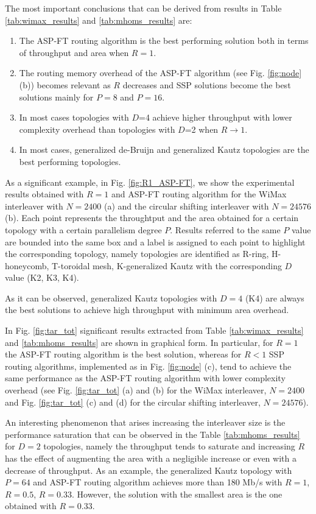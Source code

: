 \documentclass[10pt,twocolumn,journal]{IEEEtran}
\begin{document}
The most important conclusions that can be derived from results in Table \ref{tab:wimax_results} and 
\ref{tab:mhoms_results} are:
\begin{enumerate}
\item The ASP-FT routing algorithm is the best performing solution both in terms of throughput and area 
when $R=1$.
\item The routing memory overhead of the ASP-FT algorithm (see Fig. \ref{fig:node} (b)) becomes 
relevant as $R$ decreases and SSP solutions become the best solutions mainly for $P=8$ and $P=16$.
\item In most cases topologies with $D$=4 achieve higher throughput with lower complexity overhead than topologies 
with $D$=2 when $R \to 1$.
\item In most cases, generalized de-Bruijn and generalized Kautz topologies are the best performing topologies.
\end{enumerate}
As a significant example, in Fig. \ref{fig:R1_ASP-FT}, 
we show the experimental results obtained with $R=1$ and ASP-FT routing algorithm 
for the WiMax interleaver with $N=2400$ (a) and the circular shifting interleaver with $N=24576$ (b).
Each point represents the throughtput and the area 
obtained for a certain topology with a certain parallelism degree $P$. Results referred to the same $P$ value are bounded 
into the same box and a label is assigned to each point to highlight the corresponding topology, namely 
topologies are identified as R-ring, H-honeycomb, T-toroidal mesh, K-generalized Kautz 
with the corresponding $D$ value (K2, K3, K4).

As it can be observed, 
generalized Kautz topologies with $D=4$ (K4) are always the best solutions to achieve high throughput 
with minimum area overhead.

In Fig. \ref{fig:tar_tot} significant results extracted from Table \ref{tab:wimax_results} and \ref{tab:mhoms_results}
are shown in graphical form. In particular, for $R=1$ the ASP-FT routing algorithm is the best solution, whereas for 
$R<1$ SSP routing algorithms, implemented as in Fig. \ref{fig:node} (c), tend to achieve 
the same performance as the ASP-FT routing algorithm with lower complexity overhead (see 
Fig. \ref{fig:tar_tot} (a) and (b) for the WiMax interleaver, $N=2400$ and Fig. \ref{fig:tar_tot} (c) and (d) for the circular shifting 
interleaver, $N=24576$).


An interesting phenomenon that arises increasing the interleaver size is the performance saturation that can 
be observed in the Table \ref{tab:mhoms_results} for $D=2$ topologies, namely 
the throughput tends to saturate 
and increasing $R$ has the effect of augmenting the area with a negligible increase or even with a decrease of throughput.
As an example, the generalized Kautz topology with $P=64$ and ASP-FT routing algorithm achieves more than 180 Mb/s 
with $R=1$, $R=0.5$, $R=0.33$. However, the solution with the smallest area is the one obtained with $R=0.33$.
\end{document}

